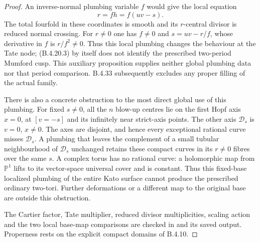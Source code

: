 \begin{proof}
An inverse-normal plumbing variable $f$ would
give the local equation
\[
 r=fh=f(uv-s).
 \tag{B.4.20.3}
\]
The total fourfold in these coordinates is
smooth and its $r$-central divisor is reduced
normal crossing. For $r\ne0$ one has $f\ne0$
and $s=uv-r/f$, whose derivative in $f$ is
$r/f^2\ne0$. Thus this local plumbing changes
the behaviour at the Tate node; (B.4.20.3) by
itself does not identify the prescribed two-period
Mumford cusp. This auxiliary proposition supplies neither
global plumbing data nor that period comparison. B.4.33
subsequently excludes any proper filling of the actual family.

There is also a concrete obstruction to the most
direct global use of this plumbing. For fixed
$s\ne0$, all the $n$ blow-up centres lie on the
first Hopf axis $x=0$, at $[v=-s]$ and its
infinitely near strict-axis points. The other
axis $\mathcal D_s$ is $v=0$, $x\ne0$.
The axes are disjoint, and hence every exceptional
rational curve misses $\mathcal D_s$. A plumbing
that leaves the complement of a small tubular
neighbourhood of $\mathcal D_s$ unchanged retains
these compact curves in its $r\ne0$ fibres over
the same $s$. A complex torus has no rational
curve: a holomorphic map from $\mathbb P^1$
lifts to its vector-space universal cover and
is constant. Thus this fixed-base localized
plumbing of the entire Kato surface cannot
produce the prescribed ordinary two-tori.
Further deformations or a different map to the
original base are outside this obstruction.

The Cartier factor, Tate multiplier, reduced
divisor multiplicities, scaling action and the
two local base-map comparisons are checked in
 and
its saved output. Properness rests on the
explicit compact domains of B.4.10.
\end{proof}
